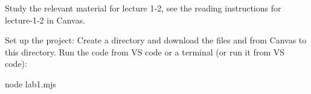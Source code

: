 \documentclass[fleqn, article, a4paper]{memoir}
\begin{document}
\begin{Assignments}

\item Study the relevant material for lecture 1-2, see the reading instructions for lecture-1-2 in Canvas. 


\item %
Set up the project: Create a directory and download the files  and  from Canvas to this directory. Run the code from VS code or a terminal (or run it from VS code):
\begin{Code}
node lab1.mjs
\end{Code}




\end{Assignments}
\end{document}
